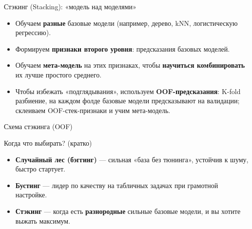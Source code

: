 \documentclass[12pt]{beamer}
\begin{document}
\begin{frame}{Стэкинг (Stacking): «модель над моделями»}
	\begin{itemize}
		\item Обучаем \textbf{разные} базовые модели (например, дерево, kNN, логистическую регрессию).
		\item Формируем \textbf{признаки второго уровня}: предсказания базовых моделей.
		\item Обучаем \textbf{мета-модель} на этих признаках, чтобы \textbf{научиться комбинировать} их лучше простого среднего.
		\item Чтобы избежать «подглядывания», используем \textbf{OOF-предсказания}: K-fold разбиение, на каждом фолде базовые модели предсказывают на валидации; склеиваем OOF-стек-признаки и учим мета-модель.
	\end{itemize}
\end{frame}

\begin{frame}{Схема стэкинга (OOF)}
	\centering
\end{frame}

\begin{frame}{Когда что выбирать? (кратко)}
	\begin{itemize}
		\item \textbf{Случайный лес (бэггинг)} — сильная «база без тюнинга», устойчив к шуму, быстро стартует.
		\item \textbf{Бустинг} — лидер по качеству на табличных задачах при грамотной настройке.
		\item \textbf{Стэкинг} — когда есть \textbf{разнородные} сильные базовые модели, и вы хотите выжать максимум.
	\end{itemize}
\end{frame}
\end{document}
